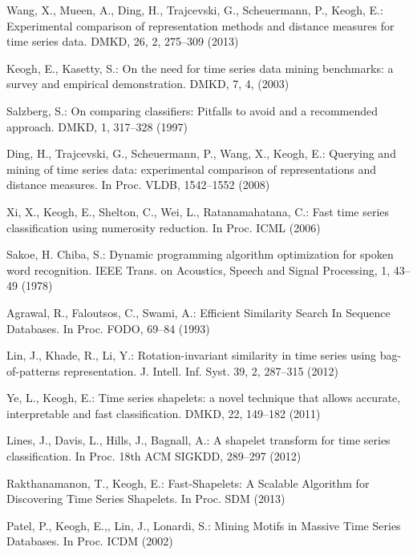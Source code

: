 \documentclass[conference]{IEEEtran}
\begin{document}

\begin{thebibliography}{4}

Wang, X., Mueen, A., Ding, H., Trajcevski, G., Scheuermann, P., Keogh, E.:
Experimental comparison of representation methods and distance measures for time series data.
DMKD, 26, 2, 275--309 (2013)

Keogh, E., Kasetty, S.:
On the need for time series data mining benchmarks: a survey and empirical demonstration.
DMKD, 7, 4, (2003)

Salzberg, S.:
On comparing classifiers: Pitfalls to avoid and a recommended approach. 
DMKD, 1, 317--328 (1997)

Ding, H., Trajcevski, G., Scheuermann, P., Wang, X., Keogh, E.:
Querying and mining of time series data: experimental comparison of representations and distance
measures. 
In Proc. VLDB, 1542--1552 (2008)

Xi, X., Keogh, E., Shelton, C., Wei, L., Ratanamahatana, C.:
Fast time series classification using numerosity reduction. 
In Proc. ICML (2006)

Sakoe, H. Chiba, S.:
Dynamic programming algorithm optimization for spoken word recognition.
IEEE Trans. on Acoustics, Speech and Signal Processing, 1, 43--49 (1978)

Agrawal, R., Faloutsos, C., Swami, A.:
Efficient Similarity Search In Sequence Databases.
In Proc. FODO, 69--84 (1993)

Lin, J., Khade, R., Li, Y.:
Rotation-invariant similarity in time series using bag-of-patterns representation. 
J. Intell. Inf. Syst. 39, 2, 287--315 (2012)

Ye, L., Keogh, E.:
Time series shapelets: a novel technique that allows accurate, interpretable and fast
classification. 
DMKD, 22, 149--182 (2011)

Lines, J., Davis, L., Hills, J., Bagnall, A.:
A shapelet transform for time series classification. 
In Proc. 18th ACM SIGKDD, 289--297 (2012)

Rakthanamanon, T., Keogh, E.:
Fast-Shapelets: A Scalable Algorithm for Discovering Time Series Shapelets.
In Proc. SDM (2013)

Patel, P., Keogh, E.,, Lin, J., Lonardi, S.:
Mining Motifs in Massive Time Series Databases. 
In Proc. ICDM (2002)


\end{thebibliography}
\end{document}
